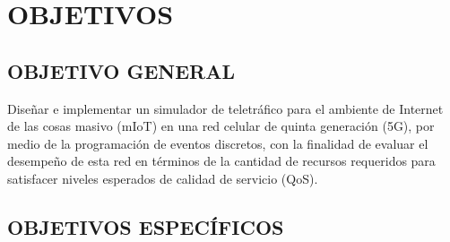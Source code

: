\section{OBJETIVOS}
\subsection{OBJETIVO GENERAL}

Diseñar e implementar un simulador de teletráfico para el ambiente de Internet de las cosas masivo (mIoT) en una red celular de quinta generación (5G), por medio de la programación de eventos discretos, con la finalidad de evaluar el desempeño de esta red en términos de la cantidad de recursos requeridos para satisfacer niveles esperados de calidad de servicio (QoS).\newline

\subsection{OBJETIVOS ESPECÍFICOS}

